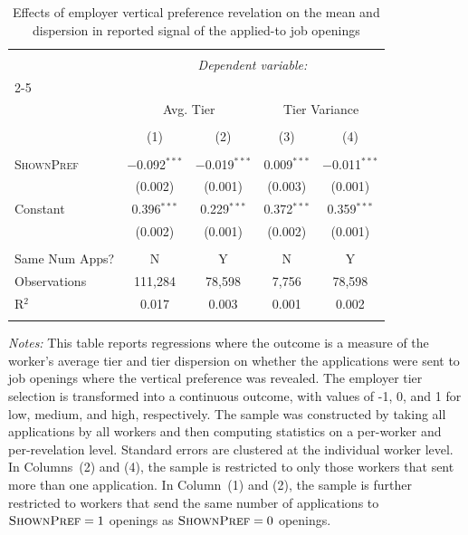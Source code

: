 
\begin{table}[!htbp] \centering 
  \caption{Effects of employer vertical preference revelation on the mean and dispersion in reported signal of the applied-to job openings} 
  \label{tab:worker_targeted_apps} 
\small 
\begin{tabular}{@{\extracolsep{5pt}}lcccc} 
\\[-1.8ex]\hline 
\hline \\[-1.8ex] 
 & \multicolumn{4}{c}{\textit{Dependent variable:}} \\ 
\cline{2-5} 
\\[-1.8ex] & \multicolumn{2}{c}{Avg. Tier} & \multicolumn{2}{c}{Tier Variance} \\ 
\\[-1.8ex] & (1) & (2) & (3) & (4)\\ 
\hline \\[-1.8ex] 
 \textsc{ShownPref} & $-$0.092$^{***}$ & $-$0.019$^{***}$ & 0.009$^{***}$ & $-$0.011$^{***}$ \\ 
  & (0.002) & (0.001) & (0.003) & (0.001) \\ 
  Constant & 0.396$^{***}$ & 0.229$^{***}$ & 0.372$^{***}$ & 0.359$^{***}$ \\ 
  & (0.002) & (0.001) & (0.002) & (0.001) \\ 
 \hline \\[-1.8ex] 
Same Num Apps? & N & Y & N & Y \\ 
Observations & 111,284 & 78,598 & 7,756 & 78,598 \\ 
R$^{2}$ & 0.017 & 0.003 & 0.001 & 0.002 \\ 
\hline 
\hline \\[-1.8ex] 
\end{tabular}
\begin{minipage}{1\textwidth} 
 \emph{Notes:} 
This table reports regressions where the outcome is a measure of the worker's average tier and tier dispersion on whether the applications were sent to job openings where the vertical preference was revealed.
The employer tier selection is transformed into a continuous outcome, with values of -1, 0, and 1 for low, medium, and high, respectively.
The sample was constructed by taking all applications by all workers and then computing statistics on a per-worker and per-revelation level.
Standard errors are clustered at the individual worker level. 
In Columns~(2) and (4), the sample is restricted to only those workers that sent more than one application.
In Column~(1) and (2), the sample is further restricted to workers that send the same number of applications to $\textsc{ShownPref}=1$ openings as $\textsc{ShownPref}=0$ openings.
 \starlanguage
 \end{minipage}
\end{table}
